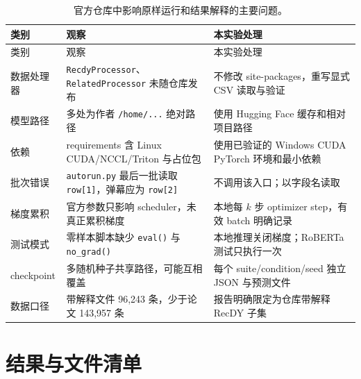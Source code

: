 \documentclass[UTF8,zihao=-4,a4paper]{ctexart}
\begin{document}
\begin{longtable}{p{3.2cm}p{5.2cm}p{6.2cm}}
\caption{官方仓库中影响原样运行和结果解释的主要问题。}\label{tab:repo-audit}\\
\toprule
类别 & 观察 & 本实验处理 \\
\midrule
\endfirsthead
\toprule
类别 & 观察 & 本实验处理 \\
\midrule
\endhead
数据处理器 & \texttt{RecdyProcessor}、\texttt{RelatedProcessor} 未随仓库发布 & 不修改 site-packages，重写显式 CSV 读取与验证 \\
模型路径 & 多处为作者 \texttt{/home/...} 绝对路径 & 使用 Hugging Face 缓存和相对项目路径 \\
依赖 & requirements 含 Linux CUDA/NCCL/Triton 与占位包 & 使用已验证的 Windows CUDA PyTorch 环境和最小依赖 \\
批次错误 & \texttt{autorun.py} 最后一批读取 \texttt{row[1]}，弹幕应为 \texttt{row[2]} & 不调用该入口；以字段名读取 \\
梯度累积 & 官方参数只影响 scheduler，未真正累积梯度 & 本地每 $k$ 步 optimizer step，有效 batch 明确记录 \\
测试模式 & 零样本脚本缺少 \texttt{eval()} 与 \texttt{no\_grad()} & 本地推理关闭梯度；RoBERTa 测试只执行一次 \\
checkpoint & 多随机种子共享路径，可能互相覆盖 & 每个 suite/condition/seed 独立 JSON 与预测文件 \\
数据口径 & 带解释文件 96,243 条，少于论文 143,957 条 & 报告明确限定为仓库带解释 RecDY 子集 \\
\bottomrule
\end{longtable}

\section{结果与文件清单}
\end{document}
